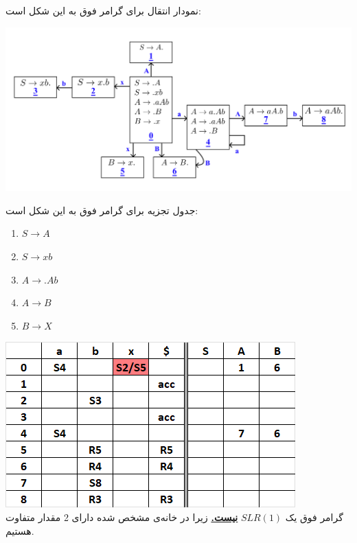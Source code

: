 نمودار انتقال برای گرامر فوق به این شکل است:

\qquad\qquad\qquad\qquad\qquad\includegraphics[width=1\linewidth]{figs/5.png}

جدول تجزیه برای گرامر فوق به این شکل است:

\setLTR

\begin{enumerate}
	\item $S\rightarrow A$
	\item $S\rightarrow xb$
	\item $A\rightarrow .Ab$
	\item $A\rightarrow B$
	\item $B\rightarrow X$					
\end{enumerate}

\setRTL

\qquad\qquad\qquad\qquad\qquad\includegraphics[width=0.5\linewidth]{figs/6.png} \\


گرامر فوق یک
 $SLR(1)$
 \textbf{\underline{نیست.}}
 زیرا در خانه‌ی مشخص شده دارای 2 مقدار متفاوت هستیم.